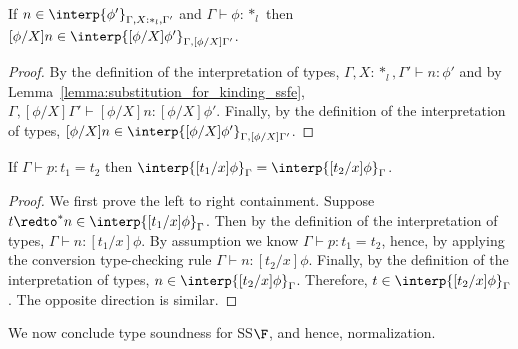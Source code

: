 \begin{corollary}
  If $n \in \interp{\phi'}_{\Gamma,X:*_l,\Gamma'}$ and 
  $\Gamma \vdash \phi:*_l$ then 
  $[\phi/X]n \in \interp{[\phi/X]\phi'}_{\Gamma,[\phi/X]\Gamma'}$.
  \label{lemma:type_sub_ssfe}
\end{corollary}
\begin{proof}
  By the definition of the interpretation of types, $\Gamma,X:*_l,\Gamma' \vdash n:\phi'$ and
  by Lemma~\ref{lemma:substitution_for_kinding_ssfe}, 
  $\Gamma,[\phi/X]\Gamma' \vdash [\phi/X]n:[\phi/X]\phi'$.  Finally,
  by the definition of the interpretation of types, 
  $[\phi/X]n \in \interp{[\phi/X]\phi'}_{\Gamma,[\phi/X]\Gamma'}$.
\end{proof}
\begin{lemma}
  \label{lemma:equality_of_interpretation_of_types_ssfe}
  If $\Gamma \vdash p:t_1 = t_2$ then $\interp{[t_1/x]\phi}_\Gamma = \interp{[t_2/x]\phi}_\Gamma$.
\end{lemma}
\begin{proof}
  We first prove the left to right containment.  Suppose $t \redto^* n
  \in \interp{[t_1/x]\phi}_\Gamma$. Then by the definition of the
  interpretation of types, $\Gamma \vdash n:[t_1/x]\phi$.  By assumption
  we know $\Gamma \vdash p:t_1 = t_2$, hence, by applying the conversion
  type-checking rule $\Gamma \vdash n:[t_2/x]\phi$.  Finally, by the
  definition of the interpretation of types, $n \in
  \interp{[t_2/x]\phi}_\Gamma$.  Therefore, $t \in
  \interp{[t_2/x]\phi}_\Gamma$.  The opposite direction is similar.
\end{proof}
We now conclude type soundness for SS$\F$, and hence, normalization.  

